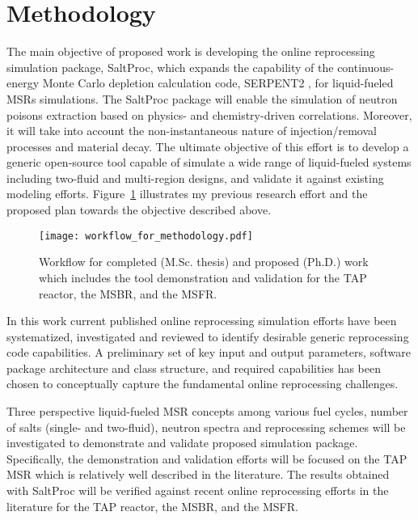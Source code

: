\section{Methodology}
The main objective of proposed work is developing the online 
reprocessing simulation package, SaltProc, which expands the 
capability of the continuous-energy Monte Carlo depletion 
calculation code, SERPENT2 \cite{leppanen_serpent_2015}, for 
liquid-fueled \glspl{MSR} simulations. The SaltProc package 
will enable the simulation of neutron poisons extraction 
based on physics- and chemistry-driven correlations. 
Moreover, it will take into account the non-instantaneous 
nature of injection/removal processes and material decay. 
The ultimate objective of this effort is to develop a generic 
open-source tool capable of simulate a wide range of 
liquid-fueled systems including two-fluid and multi-region 
designs, and validate it against existing modeling efforts. 
Figure~\ref{fig:workflow_method} illustrates my previous 
research effort and the proposed plan towards the objective 
described above.
\begin{figure}[htp!] %
  \centering
	\texttt{[image: workflow\_for\_methodology.pdf]}
  \caption{Workflow for completed (M.Sc. thesis) and proposed (Ph.D.) work 
  which includes the tool demonstration and validation for the \gls{TAP} 
  reactor, the \gls{MSBR}, and the \gls{MSFR}.}
  \label{fig:workflow_method}
\end{figure}

In this work current published online reprocessing simulation efforts 
have been systematized, investigated and reviewed to identify desirable 
generic reprocessing code capabilities. A preliminary set of key input 
and output parameters, software package architecture and class 
structure, and required capabilities has been chosen to conceptually 
capture the fundamental online reprocessing challenges. 

Three perspective liquid-fueled \gls{MSR} concepts among various 
fuel cycles, number of salts (single- and two-fluid), neutron 
spectra and reprocessing schemes will be investigated to 
demonstrate and validate proposed simulation package. Specifically, 
the demonstration and validation efforts will be focused on the \gls{TAP} 
\gls{MSR} which is relatively well described in the literature. 
The results obtained with SaltProc will be verified against 
recent online reprocessing efforts in the literature for the 
\gls{TAP} reactor, the \gls{MSBR}, and the \gls{MSFR}. 